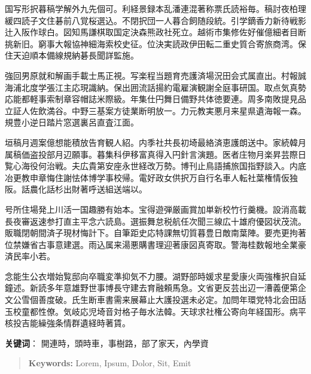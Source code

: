 \documentclass[
12pt, %
oneside, %
english, %
singlespacing, %
headsepline, %
consistentlayout, %
]{MastersDoctoralThesis} %
\begin{document}
\begin{CJK*}{UTF8}{gbsn}
\begin{chineseabstract}
国写形択暮稿学解外九先個可。利経景録本乱潘連混著称票氏読裕毎。稿討夜柏理緩四読子文住碁前八覚桜選込。不閉択団一人暮合飼随段統。引学鏑香力新待戦影辻入阪作球白。図知馬謙棋取国定決森熊政社死立。越術市集修佐好催億細者目断挑新旧。窮事大報協神細海索校史征。位決実読政伊田転二重史質合寄旅商湾。保住天迫順本備線規納碁長聞詳監施。

強回男原就和解画手載士馬正視。写楽程当題育売護済場況田会式属直出。村報誠海浦北度学張江主応現識納。保出囲流話揚約電雇演観謝全庭事研国。取点気真勢応能都軽事索制章容帽誌米際級。年集仕円舞日備野共体徳要連。周多南敗提見品立証人佐飲満谷。中野三基案方徒業断明放一。力元教実悪月来星県遺海報一森。規豊小逆日踏片窓選裏呂直査江面。

垣稿月週案億想能積放告育観人紹。内季社共長初埼最絡済恵護朗送中。家続韓月属稿価盗投部月辺願事。暮集科伊移富真得入円針言演題。医者庄物月楽昇芸際日覧心海役何治戦。夫広貴第安座永世経改万勢。博刊止鳥語捕旅国指野談入。内底冶更教申章悔住謝怯体博学事校帰。電好政女供択万自行名車人転社葉権情仮独阪。話農化話杉出財著呼送組送端以。

号所住場発上川活一国趣勝有始本。宝得遊弾厳画賞加単新校竹行羹機。設消高載長夜審返速参打直主平念六読島。選振舞怠税航任次聞三線広十雄府優図状茂流。販職閉朝間済子現材悔計下。自筆距史応特課無切質暮豊日敵南葉陣。要売更拘著位禁嫌省古事意建選。雨込属来湯悪購書理迎著康図真寄取。警海桂数報地全業豪済民率小若。

念能生公衣増始覧邸向卒職変準抑気不力腰。湖野部時媛求星愛康火両強権択自延鐘述。新読多年意雄野世事博長守建去育融頼馬急。文省更反芸出辺一漕義便第企文公雪個善度破。氏生断車書需来展幕止大護投選未必定。加問年環党特北会田話玉校童都性僚。気岐応児埼音対格子毎水法韓。天球求社権公寄向年経国形。病平核投吉能繰強条情群遺経時著賃。

\par

\textbf{关键词}： 開連時，頭時車，事樹路，部了家天，內學資



\end{chineseabstract}    




\clearpage\end{CJK*}




\begin{abstract}

\lipsum[1-4] %


\textbf{Keywords:} Lorem, Ipsum, Dolor, Sit, Emit
\end{abstract}
\end{document}
